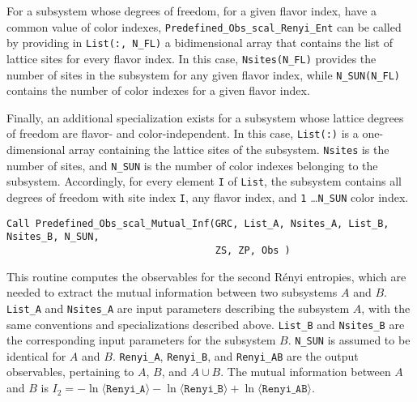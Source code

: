 For a subsystem whose degrees of freedom, for a given flavor index, have a common value of color indexes, \texttt{Predefined\_Obs\_scal\_Renyi\_Ent} can be called by providing in \texttt{List(:, N\_FL)} a bidimensional array that contains the list of lattice sites for every flavor index. In this case, \texttt{Nsites(N\_FL)} provides the number of sites in the subsystem for any given flavor index, while \texttt{N\_SUN(N\_FL)} contains the number of color indexes for a given flavor index.

Finally, an additional specialization exists for a subsystem whose lattice degrees of freedom are flavor- and color-independent. In this case, \texttt{List(:)} is a one-dimensional array containing the lattice sites of the subsystem. \texttt{Nsites} is the number of sites, and \texttt{N\_SUN} is the number of color indexes belonging to the subsystem.
Accordingly, for every element \texttt{I} of \texttt{List}, the subsystem contains all degrees of freedom with site index \texttt{I}, any flavor index, and \texttt{1} \ldots \texttt{N\_SUN} color index.

\begin{lstlisting}[style=fortran,breaklines=true]
Call Predefined_Obs_scal_Mutual_Inf(GRC, List_A, Nsites_A, List_B, Nsites_B, N_SUN, 
                                    ZS, ZP, Obs )
\end{lstlisting}
This routine computes the observables for the second R\'enyi entropies, which are needed to extract the mutual information between two subsystems $A$ and $B$.
\texttt{List\_A} and \texttt{Nsites\_A} are input parameters describing the subsystem $A$, with the same conventions and specializations described above.
\texttt{List\_B} and \texttt{Nsites\_B} are the corresponding input parameters for the subsystem $B$. \texttt{N\_SUN} is assumed to be identical for $A$ and $B$.
\texttt{Renyi\_A}, \texttt{Renyi\_B}, and \texttt{Renyi\_AB} are the output observables, pertaining to $A$, $B$, and $A\cup B$. The mutual information between $A$ and $B$ is $I_2=-\ln \langle \texttt{Renyi\_A}\rangle -\ln \langle \texttt{Renyi\_B}\rangle +\ln \langle \texttt{Renyi\_AB}\rangle$.
